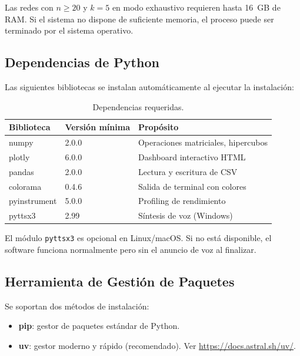 \begin{peligro}
Las redes con $n \geq 20$ y $k = 5$ en modo exhaustivo requieren hasta 16~GB de RAM. Si el sistema no dispone de suficiente memoria, el proceso puede ser terminado por el sistema operativo.
\end{peligro}

\subsection{Dependencias de Python}

Las siguientes bibliotecas se instalan automáticamente al ejecutar la instalación:

\begin{table}[H]
    \centering
    \caption{Dependencias requeridas.}
    \begin{tabular}{lll}
        \toprule
        \textbf{Biblioteca} & \textbf{Versión mínima} & \textbf{Propósito} \\
        \midrule
        numpy        & 2.0.0  & Operaciones matriciales, hipercubos \\
        plotly       & 6.0.0  & Dashboard interactivo HTML \\
        pandas       & 2.0.0  & Lectura y escritura de CSV \\
        colorama     & 0.4.6  & Salida de terminal con colores \\
        pyinstrument & 5.0.0  & Profiling de rendimiento \\
        pyttsx3      & 2.99   & Síntesis de voz (Windows) \\
        \bottomrule
    \end{tabular}
\end{table}

\begin{nota}
El módulo \lstinline|pyttsx3| es opcional en Linux/macOS. Si no está disponible, el software funciona normalmente pero sin el anuncio de voz al finalizar.
\end{nota}

\subsection{Herramienta de Gestión de Paquetes}

Se soportan dos métodos de instalación:

\begin{itemize}[itemsep=4pt]
    \item \textbf{pip}: gestor de paquetes estándar de Python.
    \item \textbf{uv}: gestor moderno y rápido (recomendado). Ver \url{https://docs.astral.sh/uv/}.
\end{itemize}
